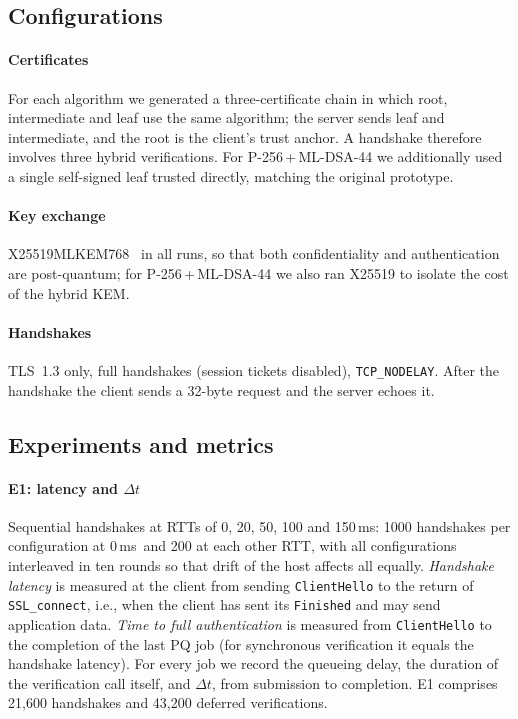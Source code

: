 \documentclass[preprint,10pt,3p]{elsarticle}
\newcommand{\Dt}{\ensuremath{\Delta t}}
\newcommand{\ms}{\,ms}
\begin{document}
\subsection{Configurations}
\label{sec:crypto_config}

\paragraph{Certificates} For each algorithm we generated a
three-certificate chain in which root, intermediate and leaf use the same
algorithm; the server sends leaf and intermediate, and the root is the
client's trust anchor.  A handshake therefore involves three hybrid
verifications.  For P-256\,+\,ML-DSA-44 we additionally used a single
self-signed leaf trusted directly, matching the original prototype.

\paragraph{Key exchange} X25519MLKEM768~\cite{ECDHEMLKEM} in all runs, so
that both confidentiality and authentication are post-quantum; for
P-256\,+\,ML-DSA-44 we also ran X25519 to isolate the cost of the hybrid
KEM.

\paragraph{Handshakes} TLS~1.3 only, full handshakes (session tickets
disabled), \texttt{TCP\_NODELAY}.  After the handshake the client sends a
32-byte request and the server echoes it.

\subsection{Experiments and metrics}

\paragraph{E1: latency and \Dt} Sequential handshakes at RTTs of 0, 20,
50, 100 and 150\ms: 1000 handshakes per configuration at 0\ms\ and 200 at
each other RTT, with all configurations interleaved in ten rounds so that
drift of the host affects all equally.  \emph{Handshake latency} is measured
at the client from sending \texttt{ClientHello} to the return of
\texttt{SSL\_connect}, i.e., when the client has sent its \texttt{Finished}
and may send application data.  \emph{Time to full authentication} is
measured from \texttt{ClientHello} to the completion of the last PQ job
(for synchronous verification it equals the handshake latency).  For every
job we record the queueing delay, the duration of the verification call
itself, and $\Dt$, from submission to completion.  E1 comprises 21{,}600
handshakes and 43{,}200 deferred verifications.
\end{document}
